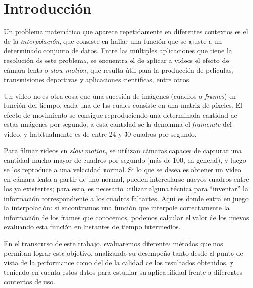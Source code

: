 \section{Introducción}
    Un problema matemático que aparece repetidamente en diferentes contextos es el de la \emph{interpolación}, que consiste en hallar una función que se ajuste a un determinado conjunto de datos. Entre las múltiples aplicaciones que tiene la resolución de este problema, se encuentra el de aplicar a videos el efecto de cámara lenta o \emph{slow motion}, que resulta útil para la producción de peliculas, transmisiones deportivas y aplicaciones cientificas, entre otros.

    Un video no es otra cosa que una sucesión de imágenes (cuadros o \emph{frames}) en función del tiempo, cada una de las cuales consiste en una matriz de píxeles. El efecto de movimiento se consigue reproduciendo una determinada cantidad de estas imágenes por segundo; a esta cantidad se la denomina el \emph{framerate} del video, y habitualmente es de entre 24 y 30 cuadros por segundo.

    Para filmar videos en \emph{slow motion}, se utilizan cámaras capaces de capturar una cantidad mucho mayor de cuadros por segundo (más de 100, en general), y luego se los reproduce a una velocidad normal. Si lo que se desea es obtener un video en cámara lenta a partir de uno normal, pueden intercalarse nuevos cuadros entre los ya existentes; para esto, es necesario utilizar alguna técnica para ``inventar'' la información correspondiente a los cuadros faltantes. Aquí es donde entra en juego la interpolación: si encontramos una función que interpole correctamente la información de los frames que conocemos, podemos calcular el valor de los nuevos evaluando esta función en instantes de tiempo intermedios.

    En el transcurso de este trabajo, evaluaremos diferentes métodos que nos permitan lograr este objetivo, analizando su desempeño tanto desde el punto de vista de la performance como del de la calidad de los resultados obtenidos, y teniendo en cuenta estos datos para estudiar su aplicabilidad frente a diferentes contextos de uso.

